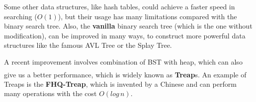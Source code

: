 \documentclass[cn,black,12pt,normal]{elegantnote}
\newcommand{\uct}[1]{\textsuperscript{\textsuperscript{\cite{#1}}}}
\begin{document}
Some other data structures, like hash tables, could achieve a faster speed in searching ($O(1)$), but their usage has many limitations compared with the binary search tree. Also, the \textbf{vanilla} binary search tree (which is the one without modification), can be improved in many ways, to construct more powerful data structures like the famous AVL Tree or the Splay Tree.

A recent improvement involves combination of BST with heap, which can also give us a better performance, which is widely known as \textbf{Treap}s.\uct{yi2005research} An example of Treaps is the \textbf{FHQ-Treap}, which is invented by a Chinese and can perform many operations with the cost $O(log\, n)$.

\newpage

\end{document}
